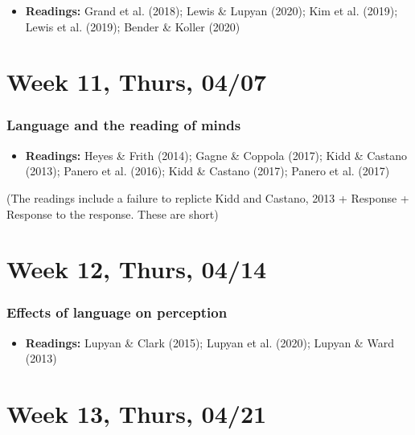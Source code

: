 \documentclass[11pt,man]{article}
\providecommand{\tightlist}{%
  \setlength{\itemsep}{0pt}\setlength{\parskip}{0pt}}
\begin{document}
\begin{itemize}
\tightlist
\item
  \textbf{Readings:} Grand et al. (2018); Lewis \& Lupyan (2020); Kim et
  al. (2019); Lewis et al. (2019); Bender \& Koller (2020)
\end{itemize}

\hypertarget{week-11-thurs-0407}{%
\section{Week 11, Thurs, 04/07}\label{week-11-thurs-0407}}

\hypertarget{language-and-the-reading-of-minds}{%
\subsubsection{Language and the reading of
minds}\label{language-and-the-reading-of-minds}}

\begin{itemize}
\tightlist
\item
  \textbf{Readings:} Heyes \& Frith (2014); Gagne \& Coppola (2017);
  Kidd \& Castano (2013); Panero et al. (2016); Kidd \& Castano (2017);
  Panero et al. (2017)
\end{itemize}

(The readings include a failure to replicte Kidd and Castano, 2013 +
Response + Response to the response. These are short)

\hypertarget{week-12-thurs-0414}{%
\section{Week 12, Thurs, 04/14}\label{week-12-thurs-0414}}

\hypertarget{effects-of-language-on-perception}{%
\subsubsection{Effects of language on
perception}\label{effects-of-language-on-perception}}

\begin{itemize}
\tightlist
\item
  \textbf{Readings:} Lupyan \& Clark (2015); Lupyan et al. (2020);
  Lupyan \& Ward (2013)
\end{itemize}

\hypertarget{week-13-thurs-0421}{%
\section{Week 13, Thurs, 04/21}\label{week-13-thurs-0421}}
\end{document}
